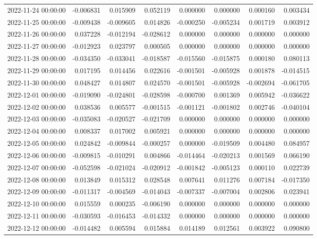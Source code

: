\begin{tabular}{lrrrrrrr}
2022-11-24 00:00:00 & -0.006831 & 0.015909 & 0.052119 & 0.000000 & 0.000000 & 0.000160 & 0.003434 \\
2022-11-25 00:00:00 & -0.009438 & -0.009605 & 0.014826 & -0.000250 & -0.005234 & 0.001719 & 0.003912 \\
2022-11-26 00:00:00 & 0.037228 & -0.012194 & -0.028612 & 0.000000 & 0.000000 & 0.000000 & 0.000000 \\
2022-11-27 00:00:00 & -0.012923 & 0.023797 & 0.000505 & 0.000000 & 0.000000 & 0.000000 & 0.000000 \\
2022-11-28 00:00:00 & -0.034350 & -0.033041 & -0.018587 & -0.015560 & -0.015875 & 0.000180 & 0.080113 \\
2022-11-29 00:00:00 & 0.017195 & 0.014456 & 0.022616 & -0.001501 & -0.005928 & 0.001878 & -0.014515 \\
2022-11-30 00:00:00 & 0.048427 & 0.014807 & 0.024570 & -0.001501 & -0.005928 & -0.002694 & -0.061705 \\
2022-12-01 00:00:00 & -0.019090 & -0.024801 & -0.028598 & -0.000700 & 0.001369 & 0.005942 & -0.036622 \\
2022-12-02 00:00:00 & 0.038536 & 0.005577 & -0.001515 & -0.001121 & -0.001802 & 0.002746 & -0.040104 \\
2022-12-03 00:00:00 & -0.035083 & -0.020527 & -0.021709 & 0.000000 & 0.000000 & 0.000000 & 0.000000 \\
2022-12-04 00:00:00 & 0.008337 & 0.017002 & 0.005921 & 0.000000 & 0.000000 & 0.000000 & 0.000000 \\
2022-12-05 00:00:00 & 0.024842 & -0.009844 & -0.000257 & 0.000000 & -0.019509 & 0.004480 & 0.084957 \\
2022-12-06 00:00:00 & -0.009815 & -0.010291 & 0.004866 & -0.014464 & -0.020213 & 0.001569 & 0.066190 \\
2022-12-07 00:00:00 & -0.052598 & -0.021024 & -0.020912 & -0.001842 & -0.005123 & 0.000110 & 0.022739 \\
2022-12-08 00:00:00 & 0.013849 & 0.015312 & 0.028548 & 0.007641 & 0.011276 & 0.007184 & -0.017350 \\
2022-12-09 00:00:00 & -0.011317 & -0.004569 & -0.014043 & -0.007337 & -0.007004 & 0.002806 & 0.023941 \\
2022-12-10 00:00:00 & 0.015559 & 0.000235 & -0.006190 & 0.000000 & 0.000000 & 0.000000 & 0.000000 \\
2022-12-11 00:00:00 & -0.030593 & -0.016453 & -0.014332 & 0.000000 & 0.000000 & 0.000000 & 0.000000 \\
2022-12-12 00:00:00 & -0.014482 & 0.005594 & 0.015884 & 0.014189 & 0.012561 & 0.003922 & 0.090800 \\

\end{tabular}
